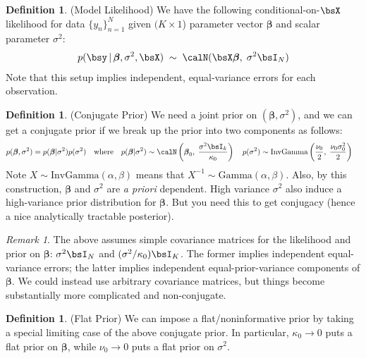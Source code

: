 \documentclass[12pt]{article}
\theoremstyle{plain}
\theoremstyle{definition}
\newtheorem{defn}[thm]{Definition}
\theoremstyle{remark}
\newtheorem*{rmk}{Remark}
\newcommand{\ra}{\rightarrow}
\newcommand{\bsbeta}{\boldsymbol{\beta}}
\newcommand{\nN}{_{n=1}^N}
\begin{document}
\begin{defn}(Model Likelihood)
We have the following conditional-on-$\bsX$ likelihood for data
$\{y_n\}\nN$ given $(K\times 1$) parameter vector $\bsbeta$ and scalar
parameter $\sigma^2$:
\begin{align*}
  p(\bsy\,|\,\bsbeta,\sigma^2,\bsX)
  \;\sim\;\calN(\bsX\bsbeta,\;\sigma^2 \bsI_N)
\end{align*}
Note that this setup implies independent, equal-variance errors for each
observation.
\end{defn}

\begin{defn}(Conjugate Prior)
We need a joint prior on $(\bsbeta,\sigma^2)$, and we can get a
conjugate prior if we break up the prior into two components as follows:
\begin{align*}
  p(\bsbeta,\sigma^2)
  =
  p(\bsbeta|\sigma^2)p(\sigma^2)
  \quad\text{where}\quad
  p(\bsbeta|\sigma^2)
  &\sim
  \calN\left(\bsbeta_0, \; \frac{\sigma^2\bsI_k}{\kappa_0}
  \right)
  \quad
  p(\sigma^2)
  \sim \text{InvGamma}\left(
  \frac{\nu_0}{2},
  \; \frac{\nu_0\sigma^2_0}{2}
  \right)
\end{align*}
Note $X\sim \text{InvGamma}(\alpha,\beta)$ means that
$X^{-1}\sim\text{Gamma}(\alpha,\beta)$.
Also, by this construction, $\bsbeta$ and $\sigma^2$ are \emph{a priori}
dependent. High variance $\sigma^2$ also induce a high-variance prior
distribution for $\bsbeta$. But you need this to get conjugacy (hence a
nice analytically tractable posterior).
\end{defn}
\begin{rmk}
The above assumes simple covariance matrices for the likelihood and
prior on $\bsbeta$: $\sigma^2\bsI_N$ and $(\sigma^2/\kappa_0)\bsI_K$.
The former implies independent equal-variance errors; the latter implies
independent equal-prior-variance components of $\bsbeta$.
We could instead use arbitrary covariance matrices, but things become
substantially more complicated and non-conjugate.
\end{rmk}

\begin{defn}(Flat Prior)
We can impose a flat/noninformative prior by taking a special limiting
case of the above conjugate prior.
In particular, $\kappa_0\ra0$ puts a flat prior on $\bsbeta$, while
$\nu_0\ra 0$ puts a flat prior on $\sigma^2$.
\end{defn}
\end{document}

